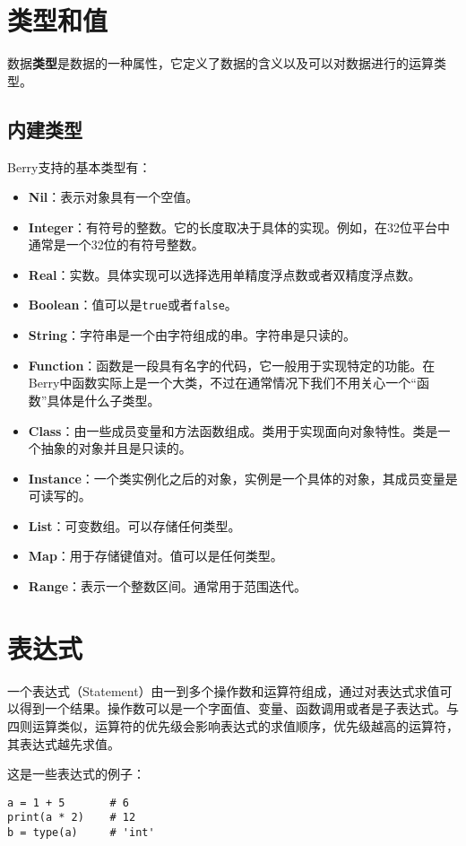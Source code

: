 \section{类型和值}

数据\textbf{类型}是数据的一种属性，它定义了数据的含义以及可以对数据进行的运算类型。

\subsection{内建类型}

Berry支持的基本类型有：

\begin{itemize}
    \item \textbf{Nil}：表示对象具有一个空值。
    \item \textbf{Integer}：有符号的整数。它的长度取决于具体的实现。例如，在32位平台中通常是一个32位的有符号整数。
    \item \textbf{Real}：实数。具体实现可以选择选用单精度浮点数或者双精度浮点数。
    \item \textbf{Boolean}：值可以是\texttt{true}或者\texttt{false}。
    \item \textbf{String}：字符串是一个由字符组成的串。字符串是只读的。
    \item \textbf{Function}：函数是一段具有名字的代码，它一般用于实现特定的功能。在Berry中函数实际上是一个大类，不过在通常情况下我们不用关心一个``函数''具体是什么子类型。
    \item \textbf{Class}：由一些成员变量和方法函数组成。类用于实现面向对象特性。类是一个抽象的对象并且是只读的。
    \item \textbf{Instance}：一个类实例化之后的对象，实例是一个具体的对象，其成员变量是可读写的。
    \item \textbf{List}：可变数组。可以存储任何类型。
    \item \textbf{Map}：用于存储键值对。值可以是任何类型。
    \item \textbf{Range}：表示一个整数区间。通常用于范围迭代。
\end{itemize}

\section{表达式}

一个表达式（Statement）由一到多个操作数和运算符组成，通过对表达式求值可以得到一个结果。操作数可以是一个字面值、变量、函数调用或者是子表达式。与四则运算类似，运算符的优先级会影响表达式的求值顺序，优先级越高的运算符，其表达式越先求值。

这是一些表达式的例子：
\begin{lstlisting}[language=berry, numbers=none]
a = 1 + 5       # 6
print(a * 2)    # 12
b = type(a)     # 'int'
\end{lstlisting}
